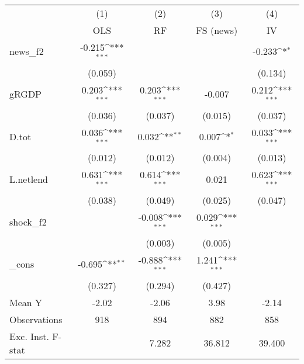 {
\def\sym#1{\ifmmode^{#1}\else\(^{#1}\)\fi}
\begin{tabular}{l*{4}{c}}
\toprule
            &\multicolumn{1}{c}{(1)}&\multicolumn{1}{c}{(2)}&\multicolumn{1}{c}{(3)}&\multicolumn{1}{c}{(4)}\\
            &\multicolumn{1}{c}{OLS}&\multicolumn{1}{c}{RF}&\multicolumn{1}{c}{FS (news)}&\multicolumn{1}{c}{IV}\\
\midrule
news\_f2     &      -0.215\sym{***}&                     &                     &      -0.233\sym{*}  \\
            &     (0.059)         &                     &                     &     (0.134)         \\
\addlinespace
gRGDP       &       0.203\sym{***}&       0.203\sym{***}&      -0.007         &       0.212\sym{***}\\
            &     (0.036)         &     (0.037)         &     (0.015)         &     (0.037)         \\
\addlinespace
D.tot       &       0.036\sym{***}&       0.032\sym{**} &       0.007\sym{*}  &       0.033\sym{***}\\
            &     (0.012)         &     (0.012)         &     (0.004)         &     (0.013)         \\
\addlinespace
L.netlend   &       0.631\sym{***}&       0.614\sym{***}&       0.021         &       0.623\sym{***}\\
            &     (0.038)         &     (0.049)         &     (0.025)         &     (0.047)         \\
\addlinespace
shock\_f2    &                     &      -0.008\sym{***}&       0.029\sym{***}&                     \\
            &                     &     (0.003)         &     (0.005)         &                     \\
\addlinespace
\_cons      &      -0.695\sym{**} &      -0.888\sym{***}&       1.241\sym{***}&                     \\
            &     (0.327)         &     (0.294)         &     (0.427)         &                     \\
\midrule
Mean Y      &       -2.02         &       -2.06         &        3.98         &       -2.14         \\
Observations&         918         &         894         &         882         &         858         \\
Exc. Inst. F-stat&                     &       7.282         &      36.812         &      39.400         \\
\bottomrule
\end{tabular}
}
